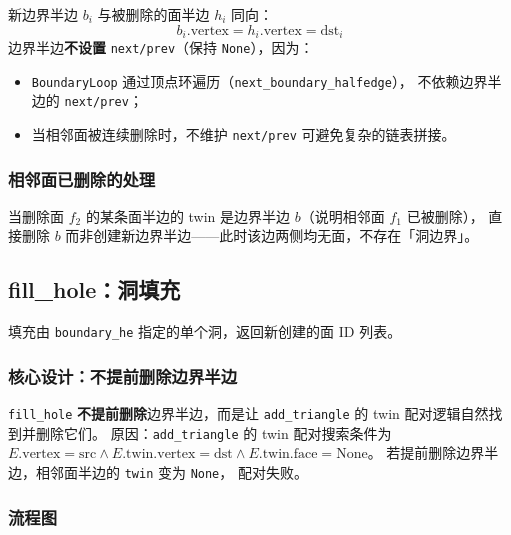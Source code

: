 \documentclass[11pt,a4paper]{article}
\begin{document}
新边界半边 $b_i$ 与被删除的面半边 $h_i$ 同向：
\[
  b_i.\text{vertex} = h_i.\text{vertex} = \text{dst}_i
\]
边界半边\textbf{不设置} \texttt{next/prev}（保持 \texttt{None}），因为：
\begin{itemize}
  \item \texttt{BoundaryLoop} 通过顶点环遍历（\texttt{next\_boundary\_halfedge}），
        不依赖边界半边的 \texttt{next/prev}；
  \item 当相邻面被连续删除时，不维护 \texttt{next/prev} 可避免复杂的链表拼接。
\end{itemize}

\subsubsection{相邻面已删除的处理}

当删除面 $f_2$ 的某条面半边的 twin 是边界半边 $b$（说明相邻面 $f_1$ 已被删除），
直接删除 $b$ 而非创建新边界半边——此时该边两侧均无面，不存在「洞边界」。

\subsection{fill\_hole：洞填充}

填充由 \texttt{boundary\_he} 指定的单个洞，返回新创建的面 ID 列表。

\subsubsection{核心设计：不提前删除边界半边}

\texttt{fill\_hole} \textbf{不提前删除}边界半边，而是让
\texttt{add\_triangle} 的 twin 配对逻辑自然找到并删除它们。
原因：\texttt{add\_triangle} 的 twin 配对搜索条件为
$E.\text{vertex}=\text{src} \wedge E.\text{twin}.\text{vertex}=\text{dst}
\wedge E.\text{twin}.\text{face}=\text{None}$。
若提前删除边界半边，相邻面半边的 \texttt{twin} 变为 \texttt{None}，
配对失败。

\subsubsection{流程图}
\end{document}
